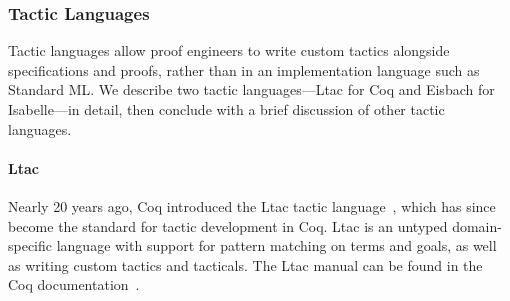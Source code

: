 \subsubsection{Tactic Languages}
\label{sec:tacticlangs}


Tactic languages allow proof engineers to write custom tactics alongside specifications and proofs, rather than in an implementation language such as Standard ML.
We describe two tactic languages---Ltac for Coq and Eisbach for Isabelle---in detail,
then conclude with a brief discussion of other tactic languages. 

\paragraph{Ltac}
Nearly 20 years ago, Coq introduced the Ltac tactic language~\citep{Delahaye2000},
which has since become the standard for tactic development in Coq.
Ltac is an untyped domain-specific language with support for pattern
matching on terms and goals, as well as writing custom tactics and tacticals.
The Ltac manual can be found in the Coq documentation~\citep{ltac}.


